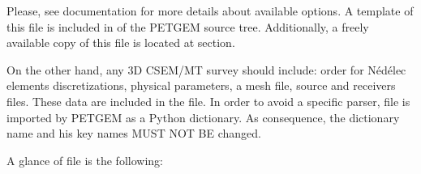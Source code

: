 \documentclass[letterpaper,10pt,english]{sphinxmanual}
\begin{document}
Please, see  documentation for more
details about available options. A template of this file is included in
 of the PETGEM source tree. Additionally, a freely
available copy of this file is located at {\hyperref[\detokenize{Download:download}]{}} section.

On the other hand, any 3D CSEM/MT survey should include: order for Nédélec elements
discretizations, physical parameters,
a mesh file, source and receivers files. These data are included in the
 file. In order to avoid a specific parser, 
file is imported by PETGEM as a Python dictionary. As consequence, the
dictionary name and his key names MUST NOT BE changed.

A glance of  file is the following:
\end{document}
